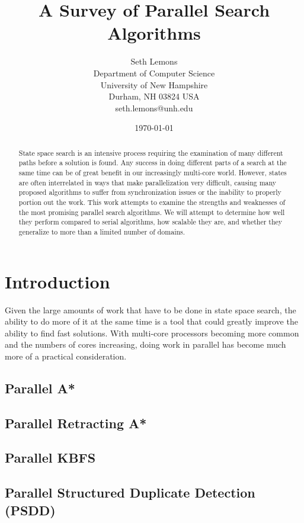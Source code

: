 \documentclass{article}
\title{A Survey of Parallel Search Algorithms}
\author{Seth Lemons \\
Department of Computer Science \\
University of New Hampshire \\
Durham, NH 03824 USA \\
seth.lemons@unh.edu}
\date{\today}
\begin{document}
\maketitle

\begin{abstract}
State space search is an intensive process requiring the examination of many different paths before a solution is found. Any success in doing different parts of a search at the same time can be of great benefit in our increasingly multi-core world. However, states are often interrelated in ways that make parallelization very difficult, causing many proposed algorithms to suffer from synchronization issues or the inability to properly portion out the work. This work attempts to examine the strengths and weaknesses of the most promising parallel search algorithms. We will attempt to determine how well they perform compared to serial algorithms, how scalable they are, and whether they generalize to more than a limited number of domains.
\end{abstract}

\section{Introduction}
Given the large amounts of work that have to be done in state space search, the ability to do more of it at the same time is a tool that could greatly improve the ability to find fast solutions. With multi-core processors becoming more common and the numbers of cores increasing, doing work in parallel has become much more of a practical consideration. 
\subsection{Parallel A*}
\subsection{Parallel Retracting A*}
\cite{evett:pra}
\subsection{Parallel KBFS}
\subsection{Parallel Structured Duplicate Detection (PSDD)}
\end{document}
